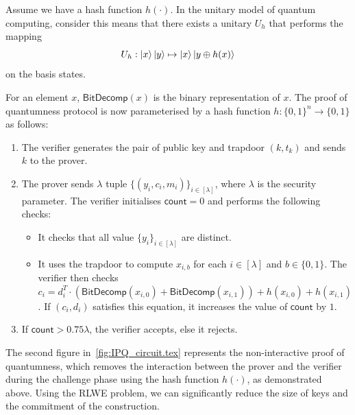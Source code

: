 Assume we have a hash function $h(\cdot)$. In the unitary model of quantum computing, consider this means that there exists a unitary $U_h$ that performs the mapping 
$$U_h: \ket{x}\ket{y} \mapsto \ket{x}\ket{y\oplus h(x)}$$
on the basis states.

For an element $x$, $\mathsf{BitDecomp}(x)$ is the binary representation of $x$. The proof of quantumness protocol is now parameterised by a hash function $h:\{0,1\}^n\to\{0,1\}$ as follows:
\begin{enumerate}
    \item The verifier generates the pair of public key and trapdoor $(k,t_k)$ and sends $k$ to the prover.
    \item The prover sends $\lambda$ tuple $\{(y_i,c_i,m_i)\}_{i\in[\lambda]}$, where $\lambda$ is the security parameter. The verifier initialises $\mathsf{count}=0$ and performs the following checks:
    \begin{itemize}
        \item It checks that all value $\{y_i\}_{i\in[\lambda]}$ are distinct.
        \item It uses the trapdoor to compute $x_{i,b}$ for each $i\in[\lambda]$ and $b\in\{0,1\}$. The verifier then checks $c_i=d_i^T\cdot(\mathsf{BitDecomp}(x_{i,0})+\mathsf{BitDecomp}(x_{i,1}))+h(x_{i,0})+h(x_{i,1})$. If $(c_i,d_i)$ satisfies this equation, it increases the value of $\mathsf{count}$ by $1$.
    \end{itemize}
    \item If $\mathsf{count}>0.75\lambda$, the verifier accepts, else it rejects.
\end{enumerate}

The second figure in~\ref{fig:IPQ_circuit.tex} represents the non-interactive proof of quantumness, which removes the interaction between the prover and the verifier during the challenge phase using the hash function $h(\cdot)$, as demonstrated above. Using the RLWE problem, we can significantly reduce the size of keys and the commitment of the construction.  


